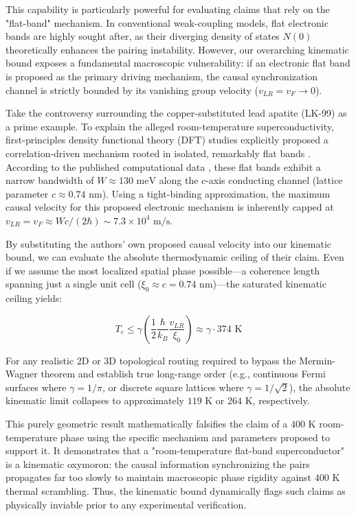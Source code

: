 \documentclass[11pt,a4paper]{article}
\begin{document}
This capability is particularly powerful for evaluating claims that rely on the "flat-band" mechanism. In conventional weak-coupling models, flat electronic bands are highly sought after, as their diverging density of states $N(0)$ theoretically enhances the pairing instability. However, our overarching kinematic bound exposes a fundamental macroscopic vulnerability: if an electronic flat band is proposed as the primary driving mechanism, the causal synchronization channel is strictly bounded by its vanishing group velocity ($v_{LR} = v_F \to 0$).

Take the controversy surrounding the copper-substituted lead apatite (LK-99) as a prime example. To explain the alleged room-temperature superconductivity, first-principles density functional theory (DFT) studies explicitly proposed a correlation-driven mechanism rooted in isolated, remarkably flat bands \cite{Griffin2023}. According to the published computational data \cite{Griffin2023}, these flat bands exhibit a narrow bandwidth of $W \approx 130 \text{ meV}$ along the $c$-axis conducting channel (lattice parameter $c \approx 0.74 \text{ nm}$). Using a tight-binding approximation, the maximum causal velocity for this proposed electronic mechanism is inherently capped at $v_{LR} = v_F \approx W c / (2\hbar) \sim 7.3 \times 10^4 \text{ m/s}$.

By substituting the authors' own proposed causal velocity into our kinematic bound, we can evaluate the absolute thermodynamic ceiling of their claim. Even if we assume the most localized spatial phase possible—a coherence length spanning just a single unit cell ($\xi_0 \approx c = 0.74 \text{ nm}$)—the saturated kinematic ceiling yields:

\begin{equation}
    T_c \le \gamma \left( \frac{1}{2} \frac{\hbar}{k_B} \frac{v_{LR}}{\xi_0} \right) \approx \gamma \cdot 374 \text{ K}
\end{equation}

For any realistic 2D or 3D topological routing required to bypass the Mermin-Wagner theorem and establish true long-range order (e.g., continuous Fermi surfaces where $\gamma = 1/\pi$, or discrete square lattices where $\gamma = 1/\sqrt{2}$), the absolute kinematic limit collapses to approximately $119 \text{ K}$ or $264 \text{ K}$, respectively. 

This purely geometric result mathematically falsifies the claim of a $400 \text{ K}$ room-temperature phase using the specific mechanism and parameters proposed to support it. It demonstrates that a "room-temperature flat-band superconductor" is a kinematic oxymoron: the causal information synchronizing the pairs propagates far too slowly to maintain macroscopic phase rigidity against $400 \text{ K}$ thermal scrambling. Thus, the kinematic bound dynamically flags such claims as physically inviable prior to any experimental verification.
\end{document}
